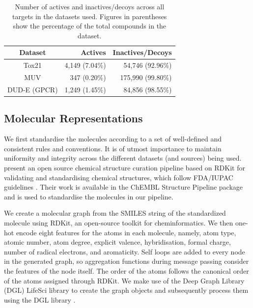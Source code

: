 \begin{table}[h]
	\centering
	\caption{Number of actives and inactives/decoys across all targets in the datasets used. Figures in parentheses show the percentage of the total compounds in the dataset.}
	\begin{tabular}{@{}crr@{}}
		\hline
		Dataset 		& Actives 			& Inactives/Decoys \\
		\hline
		Tox21 			& 4,149 (7.04\%) 	& 54,746 (92.96\%) \\
		MUV 			& 347 (0.20\%) 		& 175,990 (99.80\%) \\
		DUD-E (GPCR) 	& 1,249 (1.45\%) 	& 84,856 (98.55\%) \\
		\hline				
	\end{tabular}
	\label{table:datasetimbalance}
\end{table}



\subsection{Molecular Representations}

We first standardise the molecules according to a set of well-defined and consistent rules and conventions. It is of utmost importance to maintain uniformity and integrity across the different datasets (and sources) being used. \citet{bento2020open} present an open source chemical structure curation pipeline based on RDKit\citep{rdkit} for validating and standardising chemical structures, which follow FDA/IUPAC guidelines \citep{brecher2006graphical, food2007substance}. Their work is available in the ChEMBL Structure Pipeline package \cite{bento2020open} and is used to standardise the molecules in our pipeline. 

We create a molecular graph from the SMILES string of the standardized molecule using RDKit, an open-source toolkit for cheminformatics. We then one-hot encode eight features for the atoms in each molecule, namely, atom type, atomic number, atom degree, explicit valence, hybridisation, formal charge, number of radical electrons, and aromaticity. Self loops are added to every node in the generated graph, so aggregation functions during message passing consider the features of the node itself. The order of the atoms follows the canonical order of the atoms assigned through RDKit. We make use of the Deep Graph Library (DGL) LifeSci \cite{dgllife} library to create the graph objects and subsequently process them using the DGL library \cite{wang2019dgl}.




